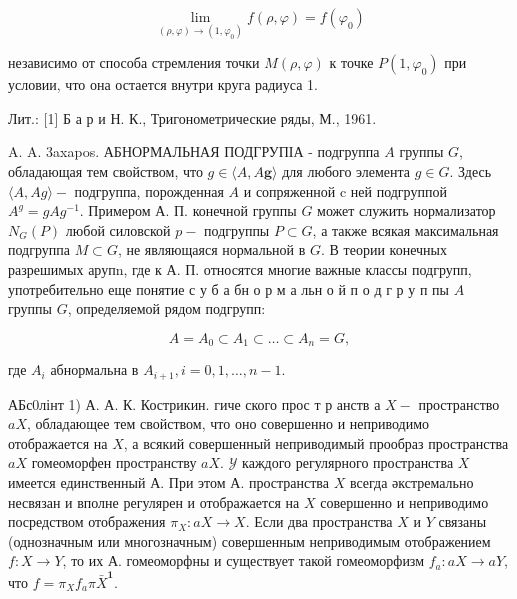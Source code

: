 \documentclass[10pt]{article}
\begin{document}
\[

\lim _{(\rho, \varphi) \rightarrow\left(1, \varphi_{0}\right)} f(\rho, \varphi)=f\left(\varphi_{0}\right)

\]



независимо от способа стремления точки $M(\rho, \varphi)$ к точке $P\left(1, \varphi_{0}\right)$ при условии, что она остается внутри круга радиуса 1.



Лит.: [1] Б а р и Н. К., Тригонометрические ряды, М., 1961.



A. A. 3axapos. АБНОРМАЛЬНАЯ ПОДГРУПІА - подгруппа $A$ группы $G$, обладающая тем свойством, что $g \in\langle A, A \boldsymbol{g}\rangle$ для любого элемента $g \in G$. Здесь $\langle A, A g\rangle-$ подгруппа, порожденная $A$ и сопряженной $\mathrm{c}$ ней подгруппой $A^{g}=g A g^{-1}$. Примером А. П. конечной группы $G$ может служить нормализатор $N_{G}(P)$ любой силовской $p-$ подгруппы $P \subset G$, а также всякая максимальная подгруппа $M \subset G$, не являющаяся нормальной в $G$. В теории конечных разрешимых арупn, где к А. П. относятся многие важные классы подгрупп, употребительно еще понятие с у б а бн о р м а льн о й п о д г р у п пы $A$ группы $G$, определяемой рядом подгрупп:



\[

A=A_{0} \subset A_{1} \subset \ldots \subset A_{n}=G,

\]



где $A_{i}$ абнормальна в $A_{i+1}, i=0,1, \ldots, n-1$.



АБс0лінт 1) А. А. К. Кострикин. гиче ского прос т р анств а $X-$ пространство $a X$, обладающее тем свойством, что оно совершенно и неприводимо отображается на $X$, а всякий совершенный неприводимый прообраз пространства $a X$ гомеоморфен пространству $a X$. $\mathcal{Y}$ каждого регулярного пространства $X$ имеется единственный А. При этом А. пространства $X$ всегда әкстремально несвязан и вполне регулярен и отображается на $X$ совершенно и неприводимо посредством отображения $\pi_{X}: a X \rightarrow X$. Если два пространства $X$ и $Y$ связаны (однозначным или многозначным) совершенным неприводимым отображением $f: X \rightarrow Y$, то их А. гомеоморфны и существует такой гомеоморфизм $f_{a}: a X \rightarrow a Y$, что $f=\pi_{X} f_{a} \pi \bar{X}^{\mathbf{1}}$.
\end{document}
